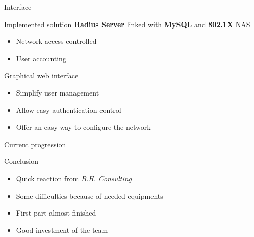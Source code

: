 \documentclass[12pt]{beamer}
\begin{document}
\begin{frame}{Interface}
\end{frame}

\begin{frame}{Implemented solution}
    \textbf{Radius Server} linked with \textbf{MySQL} and \textbf{802.1X} NAS
    \begin{itemize}
	\item Network access controlled
	\item User accounting
    \end{itemize}
    \vfill
    Graphical web interface
    \begin{itemize}
	\item Simplify user management
	\item Allow easy authentication control
	\item Offer an easy way to configure the network
    \end{itemize}
    \vfill
\end{frame}

\begin{frame}{Current progression}
\end{frame}


\begin{frame}{Conclusion}
    \begin{itemize}
	\item<1->Quick reaction from \emph{B.H. Consulting}
	\vfill
	\item<2->Some difficulties because of needed equipments
	\vfill
	\item<3->First part almost finished
	\vfill
	\item<4->Good investment of the team
    \end{itemize}
\end{frame}
\end{document}
